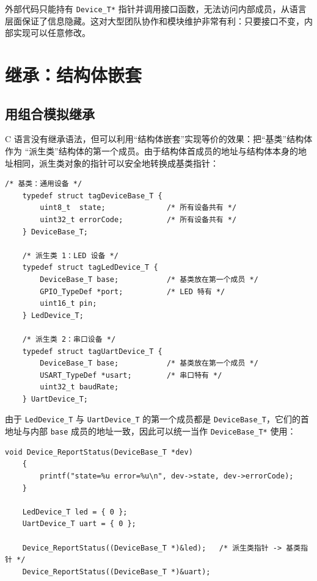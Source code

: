 外部代码只能持有 \texttt{Device\_T*} 指针并调用接口函数，无法访问内部成员，从语言层面保证了信息隐藏。这对大型团队协作和模块维护非常有利：只要接口不变，内部实现可以任意修改。

\section{继承：结构体嵌套}

\subsection{用组合模拟继承}

C 语言没有继承语法，但可以利用“结构体嵌套”实现等价的效果：把“基类”结构体作为 “派生类”结构体的第一个成员。由于结构体首成员的地址与结构体本身的地址相同，派生类对象的指针可以安全地转换成基类指针：

\begin{lstlisting}[style=c]
	/* 基类：通用设备 */
	typedef struct tagDeviceBase_T {
		uint8_t  state;              /* 所有设备共有 */
		uint32_t errorCode;          /* 所有设备共有 */
	} DeviceBase_T;
	
	/* 派生类 1：LED 设备 */
	typedef struct tagLedDevice_T {
		DeviceBase_T base;           /* 基类放在第一个成员 */
		GPIO_TypeDef *port;          /* LED 特有 */
		uint16_t pin;
	} LedDevice_T;
	
	/* 派生类 2：串口设备 */
	typedef struct tagUartDevice_T {
		DeviceBase_T base;           /* 基类放在第一个成员 */
		USART_TypeDef *usart;        /* 串口特有 */
		uint32_t baudRate;
	} UartDevice_T;
\end{lstlisting}

由于 \texttt{LedDevice\_T} 与 \texttt{UartDevice\_T} 的第一个成员都是 \texttt{DeviceBase\_T}，它们的首地址与内部 \texttt{base} 成员的地址一致，因此可以统一当作 \texttt{DeviceBase\_T*} 使用：

\begin{lstlisting}[style=c]
	void Device_ReportStatus(DeviceBase_T *dev)
	{
		printf("state=%u error=%u\n", dev->state, dev->errorCode);
	}
	
	LedDevice_T led = { 0 };
	UartDevice_T uart = { 0 };
	
	Device_ReportStatus((DeviceBase_T *)&led);   /* 派生类指针 -> 基类指针 */
	Device_ReportStatus((DeviceBase_T *)&uart);
\end{lstlisting}

